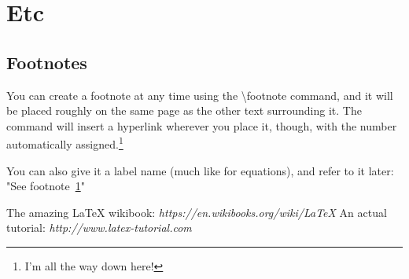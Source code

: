 \documentclass{article}
\begin{document}
\section{Etc}

    \subsection{Footnotes}
        You can create a footnote at any time using the \textbackslash footnote command, and it will be placed roughly on the same page as the other text surrounding it. The command will insert a hyperlink wherever you place it, though, with the number automatically assigned.\footnote{\label{myFootnoteName}I'm all the way down here!}
        
        You can also give it a label name (much like for equations), and refer to it later: "See footnote~\ref{myFootnoteName}"

    \newpage



\begin{thebibliography}{1}
   The amazing \LaTeX \hspace{1pt} wikibook: {\em 
https://en.wikibooks.org/wiki/LaTeX}
   An actual tutorial: {\em http://www.latex-tutorial.com}
\end{thebibliography}
\end{document}
